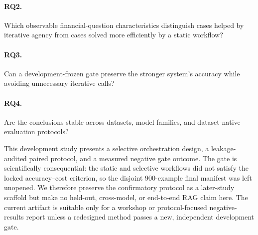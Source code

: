 \paragraph{RQ2.} Which observable financial-question characteristics distinguish cases helped by iterative agency from cases solved more efficiently by a static workflow?
\paragraph{RQ3.} Can a development-frozen gate preserve the stronger system's accuracy while avoiding unnecessary iterative calls?
\paragraph{RQ4.} Are the conclusions stable across datasets, model families, and dataset-native evaluation protocols?

This development study presents a selective orchestration design, a leakage-audited paired protocol, and a measured negative gate outcome. The gate is scientifically consequential: the static and selective workflows did not satisfy the locked accuracy--cost criterion, so the disjoint 900-example final manifest was left unopened. We therefore preserve the confirmatory protocol as a later-study scaffold but make no held-out, cross-model, or end-to-end RAG claim here. The current artifact is suitable only for a workshop or protocol-focused negative-results report unless a redesigned method passes a new, independent development gate.
